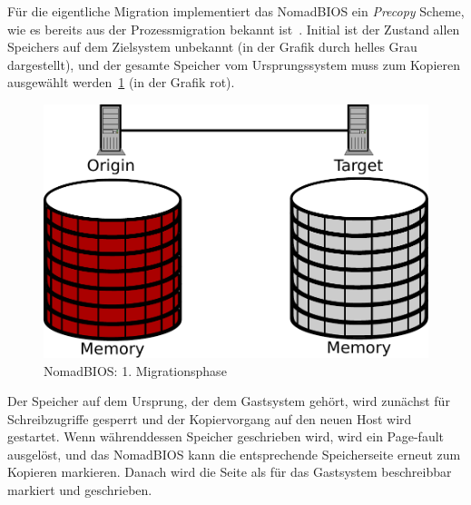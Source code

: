 Für die eigentliche Migration implementiert das NomadBIOS ein
\emph{Precopy} Scheme, wie es bereits aus der Prozessmigration bekannt
ist~\cite{hansen2002nomadic}. Initial ist der Zustand allen Speichers
auf dem Zielsystem unbekannt (in der Grafik durch helles Grau
dargestellt), und der gesamte Speicher vom Ursprungssystem muss zum
Kopieren ausgewählt werden~\ref{fig:nomad_stage1} (in der Grafik rot).
\begin{figure}[h]
  \centering
  \includegraphics[width=0.7\linewidth]{images/nomad_stage1}
  \caption{NomadBIOS: 1. Migrationsphase}
  \label{fig:nomad_stage1}
\end{figure}
Der Speicher auf dem Ursprung, der dem Gastsystem gehört, wird
zunächst für Schreibzugriffe gesperrt und der Kopiervorgang auf den
neuen Host wird gestartet. Wenn währenddessen Speicher geschrieben
wird, wird ein Page-fault ausgelöst, und das NomadBIOS kann die
entsprechende Speicherseite erneut zum Kopieren markieren. Danach wird
die Seite als für das Gastsystem beschreibbar markiert und
geschrieben.


